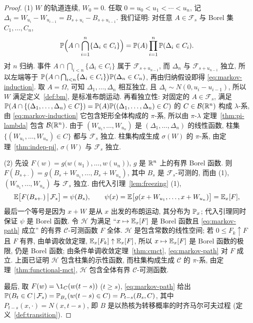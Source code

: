 \begin{proof}
(1) $W$ 的轨道连续, $W_0=0$. 任取 $0=u_0<u_1<\cdots<u_n$, 记 $\Delta_i=W_{u_i}-W_{u_{i-1}}=B_{s+u_i}-B_{s+u_{i-1}}$. 我们证明: 对任意 $A\in\mathcal{F}_s$ 与 Borel 集 $C_1,\dots,C_n$,
\begin{equation}\label{eq:markov-induction}
\P\Big(A\cap\bigcap_{i=1}^n\{\Delta_i\in C_i\}\Big)=\P(A)\prod_{i=1}^n\P(\Delta_i\in C_i).
\end{equation}
对 $n$ 归纳. 事件 $A\cap\bigcap_{i<n}\{\Delta_i\in C_i\}$ 属于 $\mathcal{F}_{s+u_{n-1}}$, 而 $\Delta_n$ 与 $\mathcal{F}_{s+u_{n-1}}$ 独立, 所以左端等于 $\P\big(A\cap\bigcap_{i<n}\{\Delta_i\in C_i\}\big)\P(\Delta_n\in C_n)$, 再由归纳假设即得 \eqref{eq:markov-induction}. 取 $A=\Omega$, 可知 $\Delta_1,\dots,\Delta_n$ 相互独立, 且 $\Delta_i\sim N(0,u_i-u_{i-1})$, 所以 $W$ 满足定义~\ref{def:bm}, 是标准布朗运动. 再看独立性: 对固定的 $A\in\mathcal{F}_s$, 满足 $\P(A\cap\{(\Delta_1,\dots,\Delta_n)\in C\})=\P(A)\P((\Delta_1,\dots,\Delta_n)\in C)$ 的 $C\in\mathcal{B}(\R^n)$ 构成 $\lambda$-系, 由 \eqref{eq:markov-induction} 它包含矩形全体构成的 $\pi$-系, 所以由 $\pi$-$\lambda$ 定理~\ref{thm:pi-lambda} 包含 $\mathcal{B}(\R^n)$. 由于 $(W_{u_1},\dots,W_{u_n})$ 是 $(\Delta_1,\dots,\Delta_n)$ 的线性函数, 柱集 $\{(W_{u_1},\dots,W_{u_n})\in C\}$ 都与 $\mathcal{F}_s$ 独立. 柱集构成生成 $\sigma(W)$ 的 $\pi$-系, 由定理~\ref{thm:indep-pi}, $\sigma(W)$ 与 $\mathcal{F}_s$ 独立.

(2) 先设 $F(w)=g\big(w(u_1),\dots,w(u_n)\big)$, $g$ 是 $\R^n$ 上的有界 Borel 函数. 则 $F(B_{s+\cdot})=g(B_s+W_{u_1},\dots,B_s+W_{u_n})$, 其中 $B_s$ 是 $\mathcal{F}_s$-可测的, 而由 (1), $(W_{u_1},\dots,W_{u_n})$ 与 $\mathcal{F}_s$ 独立. 由代入引理~\ref{lem:freezing} (1),
\[
\E\big[F(B_{s+\cdot})\,\big|\,\mathcal{F}_s\big]=\psi(B_s),\qquad\psi(x)=\E\big[g(x+W_{u_1},\dots,x+W_{u_n})\big]=\E_x[F],
\]
最后一个等号是因为 $x+W$ 是从 $x$ 出发的布朗运动, 其分布为 $\P_x$; 代入引理同时保证 $\psi$ 是 Borel 函数. 令 $\mathcal{H}$ 为满足 ``$x\mapsto\E_x[F]$ 是 Borel 函数且 \eqref{eq:markov-path} 成立'' 的有界 $\mathcal{C}$-可测函数 $F$ 全体. $\mathcal{H}$ 是包含常数的线性空间; 若 $0\le F_k\uparrow F$ 且 $F$ 有界, 由单调收敛定理, $\E_x[F_k]\uparrow\E_x[F]$, 所以 $x\mapsto\E_x[F]$ 是 Borel 函数的极限, 仍是 Borel 函数; 由条件单调收敛定理~\ref{thm:cmct}, \eqref{eq:markov-path} 对 $F$ 成立. 上面已证明 $\mathcal{H}$ 包含柱集的示性函数, 而柱集构成生成 $\mathcal{C}$ 的 $\pi$-系, 由定理~\ref{thm:functional-mct}, $\mathcal{H}$ 包含全体有界 $\mathcal{C}$-可测函数.

最后, 取 $F(w)=\1_C(w(t-s))$ ($t\ge s$), \eqref{eq:markov-path} 给出 $\P(B_t\in C\,|\,\mathcal{F}_s)=\P_{B_s}(w(t-s)\in C)=P_{t-s}(B_s,C)$, 其中 $P_{t-s}(x,\cdot)=N(x,t-s)$, 即 $B$ 是以热核为转移概率的时齐马尔可夫过程 (定义~\ref{def:transition}).
\end{proof}

